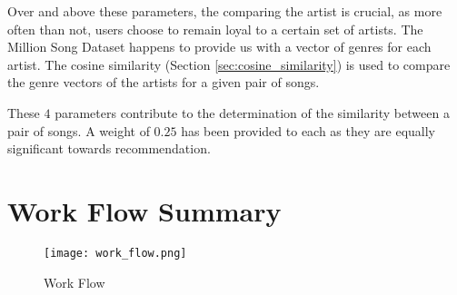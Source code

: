 			Over and above these parameters, the comparing the artist is crucial, as more often than not, users choose to remain loyal to a certain set of artists. The Million Song Dataset happens to provide us with a vector of genres for each artist. The cosine similarity (Section \ref{sec:cosine_similarity}) is used to compare the genre vectors of the artists for a given pair of songs.
			
			These \(4\) parameters contribute to the determination of the similarity between a pair of songs. A weight of \(0.25\) has been provided to each as they are equally significant towards recommendation.

	\newpage
	\section{Work Flow Summary}
		\begin{figure}[h!]
			\centering
			\texttt{[image: work\_flow.png]}
			\caption{Work Flow}
		\end{figure}
			
